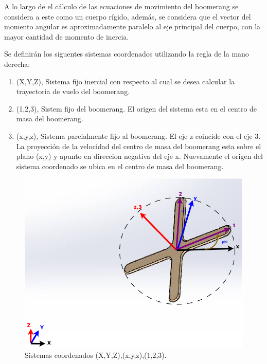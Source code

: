 	A lo largo de el cálculo de las ecuaciones de movimiento del boomerang se considera a este como un cuerpo rígido, además, se considera que el vector del momento angular es aproximadamente paralelo al eje principal del cuerpo, con la mayor cantidad de momento de inercia.

		Se definirán los siguentes sistemas coordenados utilizando la regla de la mano derecha:

		\begin{enumerate}
		\item (X,Y,Z), Sistema fijo inercial con respecto al cual se desea calcular la trayectoria de vuelo del boomerang.
		\item (1,2,3), Sistem fijo del boomerang. El origen del sistema esta en el centro de masa del boomerang.
		\item (x,y,z), Sistema parcialmente fijo al boomerang. El eje z coincide con el eje 3. La proyección de la velocidad del centro de masa del boomerang esta sobre el plano (x,y) y apunto en direccion negativa del eje x. Nuevamente el origen del sistema coordenado se ubica en el centro de masa del boomerang.
		\end{enumerate}

		\begin{figure}[ht]
		\begin{center}
		\includegraphics[scale=0.15]{imagenes/3-boomerang/sistemas_coordenados.png}
		\caption{Sistemas coordenados (X,Y,Z),(x,y,z),(1,2,3).}
		\label{fig12}
		\end{center}
		\end{figure}


